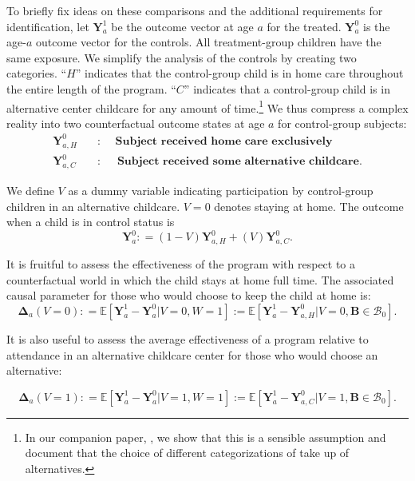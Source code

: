 \noindent To briefly fix ideas on these comparisons and the additional requirements for identification, let $\bm{Y}^1_a$ be the outcome vector at age $a$ for the treated. $\bm{Y}^0_a$ is the age-$a$ outcome vector for the controls. All treatment-group children have the same exposure. We simplify the analysis of the controls by creating two categories. ``$H$'' indicates that the control-group child is in home care throughout the entire length of the program. ``$C$'' indicates that a control-group child is in alternative center childcare for any amount of time.\footnote{In our companion paper, \citet{Garcia_Heckman_Ziff_2017_Gender-Diff_UNPUBLISHED}, we show that this is a sensible assumption and document that the choice of different categorizations of take up of alternatives.} We thus compress a complex reality into two counterfactual outcome states at age $a$ for control-group subjects:
\begin{align*}
\bm{Y}_{a,H}^0 \quad &: \quad \textbf{ Subject received home care exclusively} \\
\bm{Y}_{a,C}^0 \quad &: \quad \textbf{ Subject received some alternative childcare}.
\end{align*}

\noindent We define $V$ as a dummy variable indicating participation by control-group children in an alternative childcare. $V=0$ denotes staying at home. The outcome when a child is in control status is
\begin{equation}
\bm{Y}^0_a : = \left( 1 - V \right) \bm{Y}^0_{a,H} + \left( V \right) \bm{Y}^0_{a,C}. \label{eq:meandiff}
\end{equation}

\noindent It is fruitful to assess the effectiveness of the program with respect to a counterfactual world in which the child stays at home full time. The associated causal parameter for those who would choose to keep the child at home is:
\begin{equation}\label{eq:influenza}
\bm{\Delta}_a \left(V = 0 \right) : =   \mathbb{E} \left[ \bm{Y}^1_a - \bm{Y}^0_a | V = 0, W = 1 \right] := \mathbb{E} \left[\bm{Y}^1_{a} - \bm{Y}^0_{a,H} | V = 0, \bm{B} \in \mathcal{B}_0 \right].
\end{equation}

\noindent It is also useful to assess the average effectiveness of a program relative to attendance in an alternative childcare center for those who would choose an alternative:

\begin{equation}\label{eq:smallpox}
\bm{\Delta}_a \left( V =1 \right) : =   \mathbb{E} \left[ \bm{Y}^1_a - \bm{Y}^0_a | V = 1, W = 1 \right] := \mathbb{E} \left[\bm{Y}^1_a - \bm{Y}^0_{a,C} | V = 1, \bm{B} \in \mathcal{B}_0 \right].
\end{equation}

